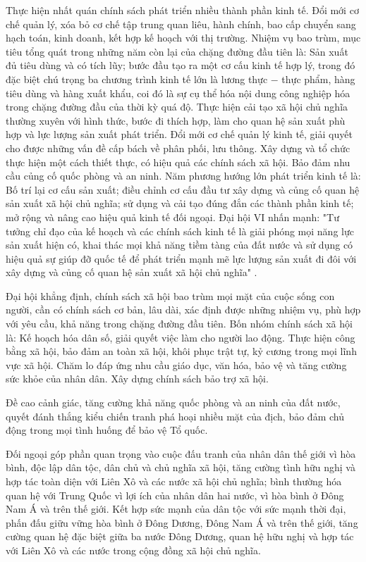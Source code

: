 Thực hiện nhất quán chính sách phát triển nhiều thành phần kinh tế. Đổi mới cơ chế quản lý, xóa bỏ cơ chế tập trung quan liêu, hành chính, bao cấp chuyển sang hạch toán, kinh doanh, kết hợp kế hoạch với thị trường. Nhiệm vụ bao trùm, mục tiêu tổng quát trong những năm còn lại của chặng đường đầu tiên là: Sản xuất đủ tiêu dùng và có tích lũy; bước đầu tạo ra một cơ cấu kinh tế hợp lý, trong đó đặc biệt chú trọng ba chương trình kinh tế lớn là lương thực $-$ thực phẩm, hàng tiêu dùng và hàng xuất khẩu, coi đó là sự cụ thể hóa nội dung công nghiệp hóa trong chặng đường đầu của thời kỳ quá độ. Thực hiện cải tạo xã hội chủ nghĩa thường xuyên với hình thức, bước đi thích hợp, làm cho quan hệ sản xuất phù hợp và lực lượng sản xuất phát triển. Đổi mới cơ chế quản lý kinh tế, giải quyết cho được những vấn đề cấp bách về phân phối, lưu thông. Xây dựng và tổ chức thực hiện một cách thiết thực, có hiệu quả các chính sách xã hội. Bảo đảm nhu cầu củng cố quốc phòng và an ninh. Năm phương hướng lớn phát triển kinh tế là: Bố trí lại cơ cấu sản xuất; điều chỉnh cơ cấu đầu tư xây dựng và củng cố quan hệ sản xuất xã hội chủ nghĩa; sử dụng và cải tạo đúng đắn các thành phần kinh tế; mở rộng và nâng cao hiệu quả kinh tế đối ngoại. Đại hội VI nhấn mạnh: "Tư tưởng chỉ đạo của kế hoạch và các chính sách kinh tế là giải phóng mọi năng lực sản xuất hiện có, khai thác mọi khả năng tiềm tàng của đất nước và sử dụng có hiệu quả sự giúp đỡ quốc tế để phát triển mạnh mẽ lực lượng sản xuất đi đôi với xây dựng và củng cố quan hệ sản xuất xã hội chủ nghĩa" .

Đại hội khẳng định, chính sách xã hội bao trùm mọi mặt của cuộc sống con người, cần có chính sách cơ bản, lâu dài, xác định được những nhiệm vụ, phù hợp với yêu cầu, khả năng trong chặng đường đầu tiên. Bốn nhóm chính sách xã hội là: Kế hoạch hóa dân số, giải quyết việc làm cho người lao động. Thực hiện công bằng xã hội, bảo đảm an toàn xã hội, khôi phục trật tự, kỷ cương trong mọi lĩnh vực xã hội. Chăm lo đáp ứng nhu cầu giáo dục, văn hóa, bảo vệ và tăng cường sức khỏe của nhân dân. Xây dựng chính sách bảo trợ xã hội.

Đề cao cảnh giác, tăng cường khả năng quốc phòng và an ninh của đất nước, quyết đánh thắng kiểu chiến tranh phá hoại nhiều mặt của địch, bảo đảm chủ động trong mọi tình huống để bảo vệ Tổ quốc.

Đối ngoại góp phần quan trọng vào cuộc đấu tranh của nhân dân thế giới vì hòa bình, độc lập dân tộc, dân chủ và chủ nghĩa xã hội, tăng cường tình hữu nghị và hợp tác toàn diện với Liên Xô và các nước xã hội chủ nghĩa; bình thường hóa quan hệ với Trung Quốc vì lợi ích của nhân dân hai nước, vì hòa bình ở Đông Nam Á và trên thế giới. Kết hợp sức mạnh của dân tộc với sức mạnh thời đại, phấn đấu giữu vững hòa bình ở Đông Dương, Đông Nam Á và trên thế giới, tăng cường quan hệ đặc biệt giữa ba nước Đông Dương, quan hệ hữu nghị và hợp tác với Liên Xô và các nước trong cộng đồng xã hội chủ nghĩa.

